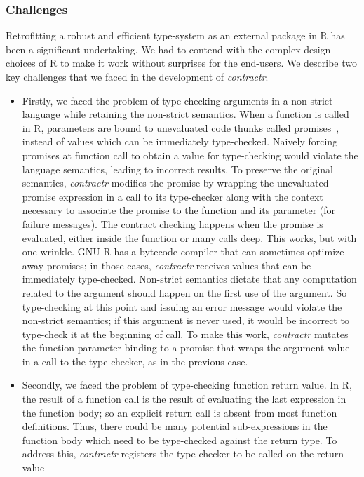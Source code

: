 \documentclass[acmsmall,review,anonymous]{acmart}\settopmatter{printfolios=true,printccs=false,printacmref=false}
\newcommand{\contractr}{\emph{contractr}\xspace} %
\begin{document}
\subsubsection{Challenges}
Retrofitting a robust and efficient type-system as an external package in R has
been a significant undertaking. We had to contend with the complex design
choices of R to make it work without surprises for the end-users. We describe
two key challenges that we faced in the development of \contractr.
\begin{itemize}
\item Firstly, we faced the problem of type-checking arguments in a non-strict
  language while retaining the non-strict semantics. When a function is called in
  R, parameters are bound to unevaluated code thunks called
  promises~\cite{oopsla19}, instead of values which can be immediately
  type-checked. Naively forcing promises at function call to obtain a value for
  type-checking would violate the language semantics, leading to incorrect
  results. To preserve the original semantics, \contractr modifies the
  promise by wrapping the unevaluated promise expression in a call to its
  type-checker along with the context necessary to associate the promise to the
  function and its parameter (for failure messages). The contract checking happens
  when the promise is evaluated, either inside the function or many calls deep.
  This works, but with one wrinkle. GNU R has a bytecode compiler that can
  sometimes optimize away promises; in those cases, \contractr receives
  values that can be immediately type-checked. Non-strict semantics dictate that
  any computation related to the argument should happen on the first use of the
  argument. So type-checking at this point and issuing an error message would
  violate the non-strict semantics; if this argument is never used, it would be
  incorrect to type-check it at the beginning of call. To make this work,
  \contractr mutates the function parameter binding to a promise that wraps
  the argument value in a call to the type-checker, as in the previous case.
\item Secondly, we faced the problem of type-checking function return value. In R, the
  result of a function call is the result of evaluating the last expression in the
  function body; so an explicit return call is absent from most function
  definitions. Thus, there could be many potential sub-expressions in the function
  body which need to be type-checked against the return type. To address this,
  \contractr registers the type-checker to be called on the return value

\end{itemize}
\end{document}
